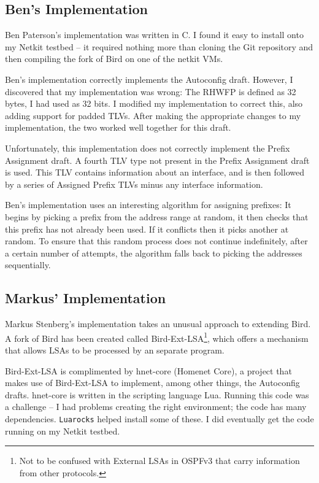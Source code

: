 \documentclass[12pt,a4paper,twoside]{report}
\begin{document}
\subsection{Ben's Implementation}
Ben Paterson's implementation was written in C. I found it easy to install onto
my Netkit testbed -- it required nothing more than cloning the Git repository
and then compiling the fork of Bird on one of the netkit VMs. 

Ben's implementation correctly implements the Autoconfig draft. However, I
discovered that my implementation was wrong: The RHWFP is defined as 32 bytes,
I had used as 32 bits. I modified my implementation to correct this, also
adding support for padded TLVs. After making the appropriate changes to my
implementation, the two worked well together for this draft.

Unfortunately, this implementation does not correctly implement the Prefix
Assignment draft. A fourth TLV type not present in the Prefix Assignment draft
is used. This TLV contains information about an interface, and is then followed
by a series of Assigned Prefix TLVs minus any interface information. 

Ben's implementation uses an interesting algorithm for assigning prefixes:
It begins by picking a prefix from the address range at random, it then checks
that this prefix has not already been used. If it conflicts then it picks
another at random. To ensure that this random process does not continue
indefinitely, after a certain number of attempts, the algorithm falls back to
picking the addresses sequentially. 

\subsection{Markus' Implementation}
Markus Stenberg's implementation takes an unusual approach to extending Bird. A
fork of Bird has been created called Bird-Ext-LSA\@\footnote{Not to be confused
with External LSAs in OSPFv3 that carry information from other protocols.},
which offers a mechanism that allows LSAs to be processed by an separate
program. 

Bird-Ext-LSA is complimented by hnet-core (Homenet Core), a project that makes
use of Bird-Ext-LSA to implement, among other things, the Autoconfig drafts\@.
hnet-core is written in the scripting language Lua. Running this code was a
challenge -- I had problems creating the right environment; the code has  many
dependencies. \texttt{Luarocks} helped install some of these. I did eventually
get the code running on my Netkit testbed.
\end{document}
